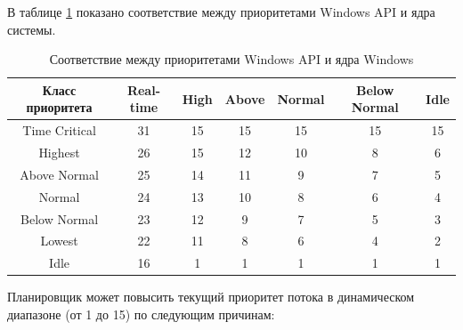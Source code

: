 В таблице \ref{tab:prioritet} показано соответствие между приоритетами Windows API и ядра системы.

\begin{table}[H]
    \caption{Соответствие между приоритетами Windows API и ядра Windows}
    \begin{center}
        \begin{tabular}{|c|c|c|c|c|c|c|}
            \hline
            Класс приоритета & Real-time & High & Above &
            Normal & Below Normal & Idle \\ \hline
            Time Critical & 31 & 15 & 15 & 15 & 15 & 15 \\ \hline
            Highest & 26 & 15 & 12 & 10 & 8 & 6 \\ \hline
            Above Normal & 25 & 14 & 11 & 9 & 7 & 5 \\ \hline
            Normal & 24 & 13 & 10 & 8 & 6 & 4 \\ \hline
            Below Normal & 23 & 12 & 9 & 7 & 5 & 3 \\ \hline
            Lowest & 22 & 11 & 8 & 6 & 4 & 2 \\ \hline
            Idle & 16 & 1 & 1 & 1 & 1 & 1 \\ \hline
        \end{tabular}
    \end{center}
    \label{tab:prioritet}
\end{table}

Планировщик может повысить текущий приоритет потока в динамическом диапазоне (от 1 до 15) по следующим причинам:

